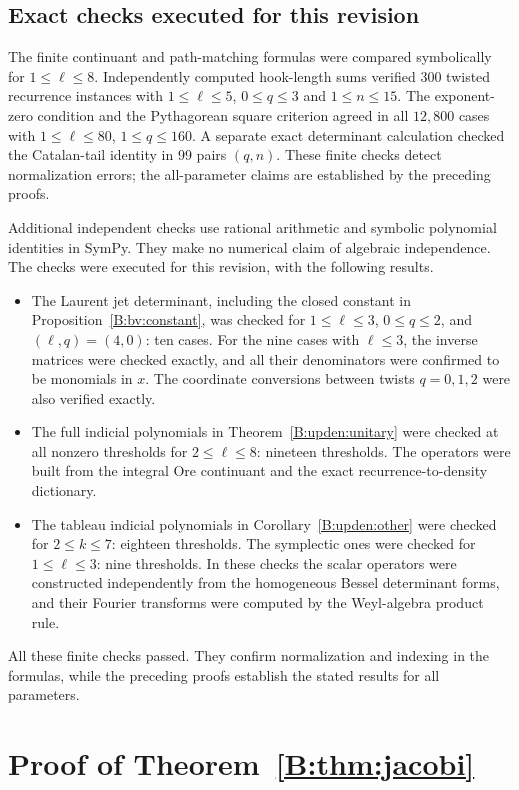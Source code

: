 \documentclass[11pt,a4paper]{article}
\theoremstyle{definition}
\theoremstyle{remark}
\numberwithin{equation}{section}
\begin{document}
\subsection*{Exact checks executed for this revision}
The finite continuant and path-matching formulas were compared symbolically
for $1\le\ell\le8$. Independently computed hook-length sums verified
300 twisted recurrence instances with $1\le\ell\le5$, $0\le q\le3$
and $1\le n\le15$. The exponent-zero condition and the Pythagorean
square criterion agreed in all $12,800$ cases with
$1\le\ell\le80$, $1\le q\le160$. A separate exact determinant
calculation checked the Catalan-tail identity in 99 pairs $(q,n)$.
These finite checks detect normalization errors; the all-parameter claims
are established by the preceding proofs.

Additional independent checks use rational arithmetic and symbolic
polynomial identities in SymPy. They make no numerical claim of
algebraic independence. The checks were executed for this revision,
with the following results.
\begin{itemize}
\item The Laurent jet determinant, including the closed constant in
Proposition~\ref{B:bv:constant}, was checked for
$1\le\ell\le3$, $0\le q\le2$, and $(\ell,q)=(4,0)$: ten cases.
For the nine cases with $\ell\le3$, the inverse matrices were checked
exactly, and all their denominators were confirmed to be monomials
in $x$. The coordinate conversions between twists $q=0,1,2$
were also verified exactly.
\item The full indicial polynomials in
Theorem~\ref{B:upden:unitary} were checked at all nonzero thresholds
for $2\le\ell\le8$: nineteen thresholds. The operators were built
from the integral Ore continuant and the exact recurrence-to-density
dictionary.
\item The tableau indicial polynomials in
Corollary~\ref{B:upden:other} were checked for $2\le k\le7$:
eighteen thresholds. The symplectic ones were checked for
$1\le\ell\le3$: nine thresholds. In these checks the scalar
operators were constructed independently from the homogeneous
Bessel determinant forms, and their Fourier transforms were
computed by the Weyl-algebra product rule.
\end{itemize}
All these finite checks passed. They confirm normalization and
indexing in the formulas, while the preceding proofs establish
the stated results for all parameters.

\section{Proof of Theorem~\ref{B:thm:jacobi}}\label{B:app:jacobi}
\end{document}
